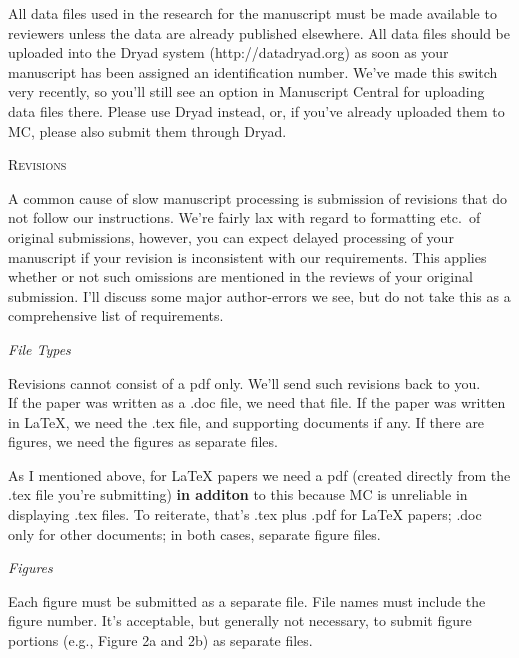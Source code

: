 \documentclass[12pt,letterpaper]{article}
\renewcommand{\section}[1]{%
\bigskip
\begin{center}
\begin{Large}
\normalfont\scshape #1
\medskip
\end{Large}
\end{center}}
\renewcommand{\subsection}[1]{%
\bigskip
\begin{center}
\begin{large}
\normalfont\itshape #1
\end{large}
\end{center}}
\begin{document}
All data files used in the research for the manuscript must be made
available to reviewers unless the data are already published
elsewhere. All data
files should be uploaded into the Dryad system (http://datadryad.org)
as soon as your manuscript has been assigned an identification
number. We've made this switch very recently, so you'll still see an
option in Manuscript Central for uploading data files there. Please
use Dryad instead, or, if you've already uploaded them to MC, please
also submit them through Dryad.

\section{Revisions}

A common cause of slow manuscript processing is submission of
revisions that do not follow our instructions. We're fairly lax with
regard to formatting etc.\ of original submissions, however, you can expect
delayed processing of your manuscript if your revision is inconsistent
with our requirements. This applies whether or not such omissions are
mentioned in the reviews of your original submission. I'll discuss some major author-errors we see, but do not take this as a
comprehensive list of requirements.

\subsection{File Types} 

Revisions cannot consist of a pdf
only. We'll send such revisions back to you.\\ If the paper was written as a .doc file, we need that
file. If the paper was written in LaTeX, we need the .tex file, and
supporting documents if any. If there are figures, we need the figures
as separate files.

As I mentioned above, for LaTeX papers we need a pdf (created
directly from the .tex file you're submitting) {\bf in additon}
to this because MC is unreliable in displaying .tex files. To
reiterate, that's .tex plus .pdf for LaTeX papers; .doc only for
other documents; in both cases, separate figure files.

\subsection{Figures}

Each figure must be submitted as a separate file. File names must
include the figure number. It's acceptable, but generally not necessary, to
submit figure portions (e.g., Figure 2a and 2b) as separate files.  
\end{document}
